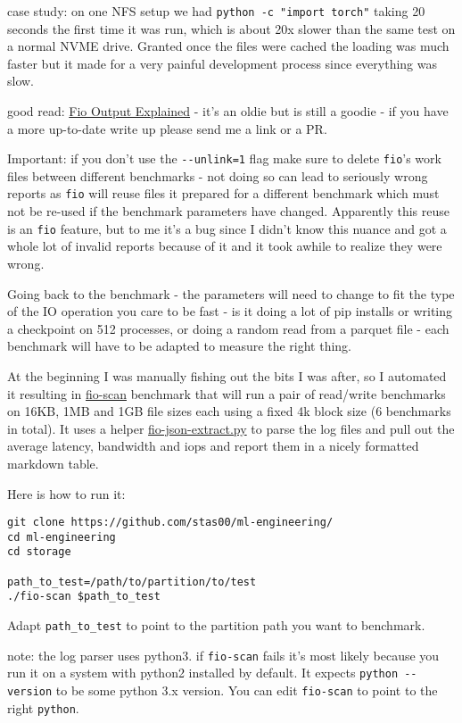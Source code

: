 \documentclass[
]{report}
\begin{document}
case study: on one NFS setup we had \texttt{python\ -c\ "import\ torch"}
taking 20 seconds the first time it was run, which is about 20x slower
than the same test on a normal NVME drive. Granted once the files were
cached the loading was much faster but it made for a very painful
development process since everything was slow.

good read:
\href{https://tobert.github.io/post/2014-04-17-fio-output-explained.html}{Fio
Output Explained} - it's an oldie but is still a goodie - if you have a
more up-to-date write up please send me a link or a PR.

Important: if you don't use the \texttt{-\/-unlink=1} flag make sure to
delete \texttt{fio}'s work files between different benchmarks - not
doing so can lead to seriously wrong reports as \texttt{fio} will reuse
files it prepared for a different benchmark which must not be re-used if
the benchmark parameters have changed. Apparently this reuse is an
\texttt{fio} feature, but to me it's a bug since I didn't know this
nuance and got a whole lot of invalid reports because of it and it took
awhile to realize they were wrong.

Going back to the benchmark - the parameters will need to change to fit
the type of the IO operation you care to be fast - is it doing a lot of
pip installs or writing a checkpoint on 512 processes, or doing a random
read from a parquet file - each benchmark will have to be adapted to
measure the right thing.

At the beginning I was manually fishing out the bits I was after, so I
automated it resulting in \href{./fio-scan}{fio-scan} benchmark that
will run a pair of read/write benchmarks on 16KB, 1MB and 1GB file sizes
each using a fixed 4k block size (6 benchmarks in total). It uses a
helper \href{./fio-json-extract.py}{fio-json-extract.py} to parse the
log files and pull out the average latency, bandwidth and iops and
report them in a nicely formatted markdown table.

Here is how to run it:

\begin{verbatim}
git clone https://github.com/stas00/ml-engineering/
cd ml-engineering
cd storage

path_to_test=/path/to/partition/to/test
./fio-scan $path_to_test
\end{verbatim}

Adapt \texttt{path\_to\_test} to point to the partition path you want to
benchmark.

note: the log parser uses python3. if \texttt{fio-scan} fails it's most
likely because you run it on a system with python2 installed by default.
It expects \texttt{python\ -\/-version} to be some python 3.x version.
You can edit \texttt{fio-scan} to point to the right \texttt{python}.
\end{document}
